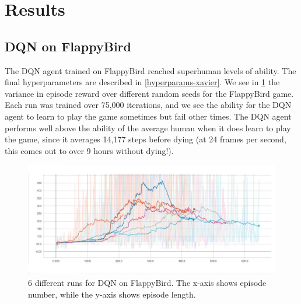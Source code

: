 \documentclass{article}
\begin{document}
\section{Results}

\subsection{DQN on FlappyBird}

The DQN agent trained on FlappyBird reached superhuman levels of ability. 
The final hyperparameters are described in \ref{hyperparams-xavier}.
We see in \ref{fig:flappy-training-eps} the variance in episode reward over different random seeds for the FlappyBird game.
Each run was trained over 75,000 iterations, and we see the ability for the DQN agent to learn to play the game sometimes but fail other times.
The DQN agent performs well above the ability of the average human when it does learn to play the game, since it averages 14,177 steps before dying (at 24 frames per second, this comes out to over 9 hours without dying!).

\begin{figure}[h!]
\includegraphics[width=\textwidth]{flappy-training-eps}
\caption{6 different runs for DQN on FlappyBird. The x-axis shows episode number, while the y-axis shows episode length.}
\label{fig:flappy-training-eps}
\end{figure}
\end{document}
